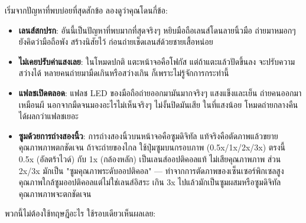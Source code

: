 


เริ่มจากปัญหาที่พบบ่อยที่สุดสักข้อ ลองดูว่าคุณโดนกี่ข้อ:

\begin{itemize}
  \item \textbf{เลนส์สกปรก}: อันนี้เป็นปัญหาที่พบมากที่สุดจริงๆ หยิบมือถือเลนส์โดนลายนิ้วมือ ถ่ายมาหมอกๆ ยังคิดว่ามือถือพัง สร้างนิสัยไว้ ก่อนถ่ายเช็ดเลนส์ด้วยชายเสื้อหน่อย
  \item \textbf{ไม่เคยปรับค่าแสงเลย}: ในโหมดปกติ แตะหน้าจอคือโฟกัส แต่ถ้าแตะแล้วปัดขึ้นลง จะปรับความสว่างได้ หลายคนถ่ายมามืดเกินหรือสว่างเกิน ก็เพราะไม่รู้จักการกระทำนี้
  \item \textbf{แฟลชเปิดตลอด}: แฟลช LED ของมือถือถ่ายออกมามันมากจริงๆ แสงแข็งและเย็น ถ่ายคนออกมาเหมือนผี นอกจากมืดจนมองอะไรไม่เห็นจริงๆ ไม่งั้นปิดมันเสีย ในที่แสงน้อย โหมดถ่ายกลางคืนได้ผลกว่าแฟลชเยอะ
  \item \textbf{ซูมด้วยการถ่างสองนิ้ว}: การถ่างสองนิ้วบนหน้าจอคือซูมดิจิทัล แท้จริงคือตัดภาพแล้วขยาย คุณภาพภาพตกชัดเจน ถ้าจะถ่ายของไกล ใช้ปุ่มซูมบนกรอบภาพ (0.5x/1x/2x/3x) ตรงนี้ 0.5x (อัลตร้าไวด์) กับ 1x (กล้องหลัก) เป็นเลนส์ออปติคอลแท้ ไม่เสียคุณภาพภาพ ส่วน 2x/3x มักเป็น "ซูมคุณภาพระดับออปติคอล" — ทำจากการตัดภาพของเซ็นเซอร์พิกเซลสูง คุณภาพใกล้ซูมออปติคอลแต่ไม่ใช่เลนส์อิสระ เกิน 3x ไปแล้วมักเป็นซูมผสมหรือซูมดิจิทัล คุณภาพภาพจะตกชัดเจน
\end{itemize}


พวกนี้ไม่ต้องใช้ทฤษฎีอะไร ใช้รอบเดียวเห็นผลเลย:

